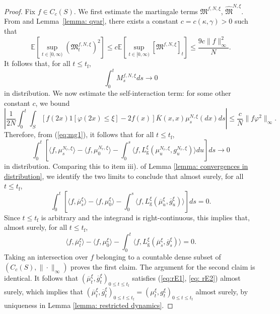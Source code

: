 \documentclass[11pt, notitlepage]{article}
\newcommand{\EE}{\ensuremath{\mathbb{E}}}
\newcommand{\abs}[1]{\left\lvert{#1}\right\rvert}
\begin{document}
\begin{proof}
Fix $f\in C_c(S)$. We first estimate the martingale terms $\mathfrak{M}^{f,N,\xi}$,  $\widehat{\mathfrak{M}}^{N,\xi}$. From \cite[Thrm. 26.12]{K02} and Lemma~\ref{lemma: qvar}, there exists a  constant $c=c(\kappa,\gamma)>0$ such that
\begin{equation}
    \EE\left[\sup_{t\in[0,\infty)} \left(\mathfrak{M}_t^{f,N,\xi}\right)^2\right]
    \leq c \EE\left[\sup_{t\in[0,\infty)} \left[\mathfrak{M}^{f,N,\xi}\right]_t\right]
    \leq \frac{9c \|f\|_\infty^2}{N}.
\end{equation} It follows that, for all $t\le t_\mathrm{f}$,\begin{equation} \int_0^{t} M^{f,N,\xi}_s d s \rightarrow 0\end{equation} in distribution.
We now estimate the self-interaction term: for some other constant $c$, we bound
\begin{equation}
   \abs{\frac{1}{2N}\int_0^t \int_S \left[f(2x)1[\varphi(2x)\leq \xi] - 2f(x)\right]\overline{K}(x,x)\mu^{N,\xi}_s(d x) d s}
   \leq \frac{c}{N}\|f\varphi^2\|_\infty.
\end{equation}
Therefore, from (\ref{eq:mg1}), it follows that for all $t \le t_\mathrm{f}$, \begin{equation} \int_0^t\left[\langle f,\mu^{N_r, \xi}_{s}\rangle -\langle f, \mu^{N_r,\xi}_0\rangle -\int_0^{s} \langle f, L^\xi_\mathrm{g}(\mu^{N_r,\xi}_u, g^{N_r,\xi}_u)\rangle du \right]ds\rightarrow 0 \end{equation} in distribution. Comparing this to item iii). of Lemma \ref{lemma: convergences in distribution}, we identify the two limits to conclude that almost surely, for all $t\le t_\mathrm{f}$, \begin{equation} \int_0^t\left[\langle f, \overline{\mu}^{\xi}_s\rangle -\langle f, {\mu}^{\xi}_0\rangle -\int_0^s \langle f, L^\xi_\mathrm{g}(\overline{\mu}^{\xi}_u, \overline{g}^{\xi}_u)\rangle \right]ds =0.\end{equation} Since $t\le t_\mathrm{f}$ is arbitrary and the integrand is right-continuous, this implies that, almost surely, for all $t\le t_\mathrm{f}$, \begin{equation} \langle f, \overline{\mu}^{\xi}_t\rangle -\langle f, {\mu}^{\xi}_0\rangle -\int_0^t \langle f, L^\xi_\mathrm{g}(\overline{\mu}^{\xi}_s, \overline{g}^{\xi}_s)\rangle  =0.\end{equation} Taking an intersection over $f$ belonging to a countable dense subset of $(C_c(S), \|\cdot\|_\infty)$ proves the first claim. The argument for the second claim is identical. It follows that $(\overline{\mu}^\xi_t, \overline{g}^\xi_t)_{0\le t\le t_\mathrm{f}}$ satisfies (\ref{eq:rE1}, \ref{eq: rE2}) almost surely, which implies that $(\overline{\mu}^\xi_t, \overline{g}^\xi_t)_{0\le t\le t_\mathrm{f}}=(\mu^\xi_t, g^\xi_t)_{0\le t\le t_\mathrm{f}}$ almost surely, by uniqueness in Lemma \ref{lemma: restricted dynamics}.
\end{proof}
\end{document}
